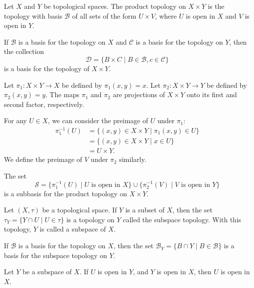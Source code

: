 \documentclass{article}
\newcommand{\inv}{^{-1}}
\newcommand{\B}{\mathcal B}
\begin{document}
\medskip{}

    Let $X$ and $Y$ be topological spaces. The product topology on $X \times Y$ is the topology with basis $\B$ of all sets of the form $U \times V$, where $U$ is open in $X$ and $V$ is open in $Y$.

\medskip{}

    If $\B$ is a basis for the topology on $X$ and $\mathcal C$ is a basis for the topology on $Y$, then the collection $$\mathcal D = \{B \times C \mid B \in \B, c \in \mathcal C\}$$ is a basis for the topology of $X \times Y$.

\medskip{}

    Let $\pi_1: X \times Y \to X$ be defined by $\pi_1(x,y) = x$.
    Let $\pi_2: X \times Y \to Y$ be defined by $\pi_2(x,y) = y$.
    The maps $\pi_1$ and $\pi_2$ are projections of $X \times Y$ onto its first and second factor, respectively.

    For any $U \in X$, we can consider the preimage of $U$ under $\pi_1$:
    \begin{align*}
        \pi_1\inv(U) &= \{(x,y) \in X \times Y \mid \pi_1(x,y) \in U\} \\
                     &= \{(x,y) \in X \times Y \mid x \in U\} \\
                     &= U \times Y.
    \end{align*}
    We define the preimage of $V$ under $\pi_2$ similarly.

\medskip{}

    The set $$\mathcal S = \{\pi_1\inv(U) \mid U \text{ is open in } X\} \cup \{\pi_2\inv(V) \mid V \text{ is open in } Y\}$$ is a subbasis for the product topology on $X \times Y$.

\medskip{}

    Let $(X,\tau)$ be a topological space. If $Y$ is a subset of $X$, then the set $\tau_Y = \{Y \cap U \mid U \in \tau\}$ is a topology on $Y$ called the subspace topology. With this topology, $Y$ is called a subspace of $X$.

\medskip{}

    If $\B$ is a basis for the topology on $X$, then the set $\B_Y = \{B \cap Y \mid B \in \B\}$ is a basis for the subspace topology on $Y$.

\medskip{}

    Let $Y$ be a subspace of $X$. If $U$ is open in $Y$, and $Y$ is open in $X$, then $U$ is open in $X$.
\end{document}
